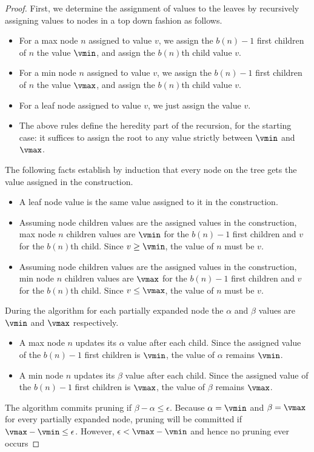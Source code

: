 \begin{proof}
First, we determine the assignment of values to the leaves by recursively assigning values to nodes in a top down fashion as follows.

\begin{itemize}
  \item For a max node $n$ assigned to value $v$, we assign the $b(n)-1$ first children of $n$ the value $\vmin$, and assign the $b(n)$th child value $v$.
  \item For a min node $n$ assigned to value $v$, we assign the $b(n)-1$ first children of $n$ the value $\vmax$, and assign the $b(n)$th child value $v$.
  \item For a leaf node assigned to value $v$, we just assign the value $v$.
  \item The above rules define the heredity part of the recursion, for the starting case: it suffices to assign the root to any value strictly between $\vmin$ and $\vmax$.
\end{itemize}

The following facts establish by induction that every node on the tree gets the value assigned in the construction.
\begin{itemize}
  \item A leaf node value is the same value assigned to it in the construction.  
  \item Assuming node children values are the assigned values in the construction, max node $n$ children values are $\vmin$ for the $b(n)-1$ first children and $v$ for the $b(n)$th child. Since $v \geq \vmin$, the value of $n$ must be $v$.
    \item Assuming node children values are the assigned values in the construction, min node $n$ children values are $\vmax$ for the $b(n)-1$ first children and $v$ for the $b(n)$th child. Since $v \leq \vmax$, the value of $n$ must be $v$.
\end{itemize}

During the algorithm for each partially expanded node the $\alpha$ and $\beta$ values are $\vmin$ and $\vmax$ respectively.
\begin{itemize}
  \item A max node $n$ updates its $\alpha$ value after each child. Since the assigned value of the $b(n)-1$ first children is $\vmin$, the value of $\alpha$ remains $\vmin$.
  \item A min node $n$ updates its $\beta$ value after each child. Since the assigned value of the $b(n)-1$ first children is $\vmax$, the value of $\beta$ remains $\vmax$.
\end{itemize}
The algorithm commits pruning if $\beta - \alpha \leq \epsilon$. Because $\alpha = \vmin$ and $\beta = \vmax$ for every partially expanded node, pruning will be committed if $\vmax - \vmin \leq \epsilon$. However, $\epsilon < \vmax - \vmin$ and hence no pruning ever occurs
\end{proof}


